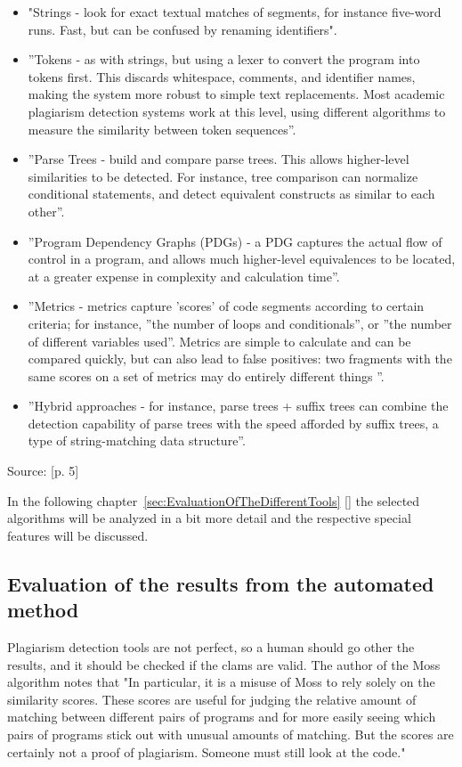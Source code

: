 \documentclass[a4paper, 11pt]{article}
\renewcommand{\\}{\vspace*{0.5\baselineskip} \newline}
\begin{document}
\begin{itemize}
	\item "Strings - look for exact textual matches of segments, for instance five-word runs. Fast, but can be confused by renaming identifiers".
	\item ”Tokens - as with strings, but using a lexer to convert the program into tokens first. This discards whitespace, comments, and identifier names, making the system more robust to simple text replacements. Most academic plagiarism detection systems work at this level, using different algorithms to measure the similarity between token sequences”.
	\item ”Parse Trees - build and compare parse trees. This allows higher-level similarities to be detected. For instance, tree comparison can normalize conditional statements, and detect equivalent constructs as similar to each other”.
	\item ”Program Dependency Graphs (PDGs) - a PDG captures the actual flow of control in a program, and allows much higher-level equivalences to be located, at a greater expense in complexity and calculation time”.
	\item ”Metrics - metrics capture ’scores’ of code segments according to certain criteria; for instance, ”the number of loops and conditionals”, or ”the number of different variables used”. Metrics are simple to calculate and can be compared quickly, but can also lead to false positives: two fragments with the same scores on a set of metrics may do entirely different things ”.
	\item ”Hybrid approaches - for instance, parse trees + suffix trees can combine the detection capability of parse trees with the speed afforded by suffix trees, a type of string-matching data structure”.
\end{itemize}
Source: \autocite{OaCoPDT}[p. 5]

In the following chapter~\ref{sec:EvaluationOfTheDifferentTools} [] the selected algorithms will be analyzed in a bit more detail and the respective special features will be discussed.

\subsection{Evaluation of the results from the automated method}

Plagiarism detection tools are not perfect, so a human should go other the results, and it should be checked if the clams are valid. The author of the Moss algorithm \autocite{SMOSS} notes that "In particular, it is a misuse of Moss to rely solely on the similarity scores. These scores are useful for judging the relative amount of matching between different pairs of programs and for more easily seeing which pairs of programs stick out with unusual amounts of matching. But the scores are certainly not a proof of plagiarism. Someone must still look at the code."
\end{document}
